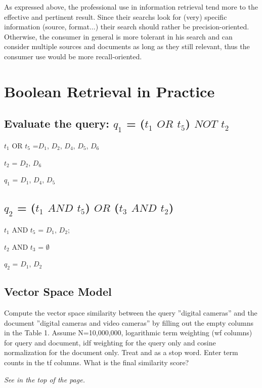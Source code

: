 \documentclass{scrartcl}
\begin{document}
As expressed above, the professional use in information retrieval tend more to the effective and pertinent result. Since their searchs look for (very) specific information (source, format...) their search should rather be precision-oriented. Otherwise, the consumer in general is more tolerant in his search and can consider multiple sources and documents as long as they still relevant, thus the consumer use would be more recall-oriented.

\section{Boolean Retrieval in Practice}

\subsection{Evaluate the query: $q_1$ = ($t_1$    $OR$    $t_5$)   $NOT$   $t_2$ }



  $t_1$     OR    $t_5$ =$ D_1$, $D_2$, $D_4$, $D_5$, $D_6$
 
  $t_2$ = $D_2$, $D_6$

  $q_1$ = $D_1$, $D_4$, $D_5$


\subsection{$q_2$ = ($t_1$     $AND$    $t_5$)    $ OR$     ($t_3$     $AND$    $t_2$)}


$t_1 $    AND    $t_5$ = $D_1$, $D_2$; 

$t_2$     AND   $t_3$ = $\emptyset $

$q_2$ = $D_1$, $D_2$

\subsection{ Vector Space Model}

Compute the vector space similarity between the query ”digital cameras” and the document
”digital cameras and video cameras” by filling out the empty columns in the Table 1. Assume
N=10,000,000, logarithmic term weighting (wf columns) for query and document, idf weighting
for the query only and cosine normalization for the document only. Treat and as a stop word.
Enter term counts in the tf columns. What is the final similarity score? 

\textit{See in the top of the page.}
\end{document}
